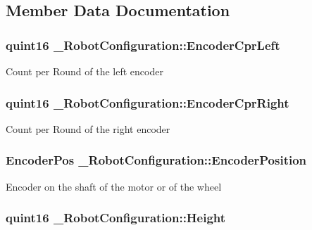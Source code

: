 \subsection{Member Data Documentation}
\hypertarget{struct___robot_configuration_af182347d3c875e986ba720760ef55a54}{
\subsubsection[{Encoder\-Cpr\-Left}]{\setlength{\rightskip}{0pt plus 5cm}quint16 \-\_\-\-Robot\-Configuration\-::\-Encoder\-Cpr\-Left}}\label{struct___robot_configuration_af182347d3c875e986ba720760ef55a54}
Count per Round of the left encoder \hypertarget{struct___robot_configuration_a63e2c47bb9763838aa3b1b097890a5a5}{
\subsubsection[{Encoder\-Cpr\-Right}]{\setlength{\rightskip}{0pt plus 5cm}quint16 \-\_\-\-Robot\-Configuration\-::\-Encoder\-Cpr\-Right}}\label{struct___robot_configuration_a63e2c47bb9763838aa3b1b097890a5a5}
Count per Round of the right encoder \hypertarget{struct___robot_configuration_a5a5010ca51d595bec652a274216e8d8e}{
\subsubsection[{Encoder\-Position}]{\setlength{\rightskip}{0pt plus 5cm}Encoder\-Pos \-\_\-\-Robot\-Configuration\-::\-Encoder\-Position}}\label{struct___robot_configuration_a5a5010ca51d595bec652a274216e8d8e}
Encoder on the shaft of the motor or of the wheel \hypertarget{struct___robot_configuration_afb09adbb9fd458bb18c9aa2dd25b9be0}{
\subsubsection[{Height}]{\setlength{\rightskip}{0pt plus 5cm}quint16 \-\_\-\-Robot\-Configuration\-::\-Height}}\label{struct___robot_configuration_afb09adbb9fd458bb18c9aa2dd25b9be0}
